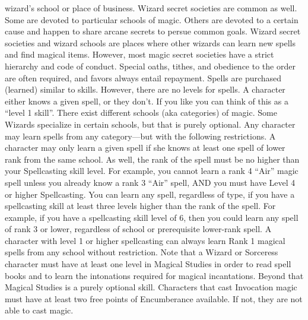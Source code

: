 \documentclass[twoside]{book}
\begin{document}
               wizard’s school or place of business. Wizard secret
               societies are common as well. Some are devoted to
               particular schools of magic. Others are devoted to a
               certain cause and happen to share arcane secrets to persue
               common goals. Wizard secret societies and wizard schools
               are places where other wizards can learn new spells and
               find magical items. However, most magic secret societies
               have a strict hierarchy and code of conduct. Special
               oaths, tithes, and obedience to the order are often
               required, and favors always entail repayment.   Spells are purchased (learned) similar to skills.
               However, there are no levels for spells. A character
               either knows a given spell, or they don’t. If you
               like you can think of this as a “level 1
               skill”.   There exist different schools (aka categories) of
               magic. Some Wizards specialize in certain schools, but
               that is purely optional. Any character may learn spells
               from any category—but with the following
               restrictions. A character may only learn a given spell if
               she knows at least one spell of lower rank from the same
               school. As well, the rank of the spell must be no higher
               than your Spellcasting skill level. For example, you
               cannot learn a rank 4 “Air” magic spell unless
               you already know a rank 3 “Air” spell, AND you
               must have Level 4 or higher Spellcasting.   You can learn any spell, regardless of type, if you
               have a spellcasting skill at least three levels higher
               than the rank of the spell. For example, if you have a
               spellcasting skill level of 6, then you could learn any
               spell of rank 3 or lower, regardless of school or
               prerequisite lower-rank spell.   A character with level 1 or higher spellcasting can
               always learn Rank 1 magical spells from any school without
               restriction.   Note that a Wizard or Sorceress character must have
               at least one level in Magical Studies in order to read
               spell books and to learn the intonations required for
               magical incantations. Beyond that Magical Studies is a
               purely optional skill.   Characters that cast Invocation magic must have at
               least two free points of Encumberance available. If not,
               they are not able to cast magic. 
\end{document}
